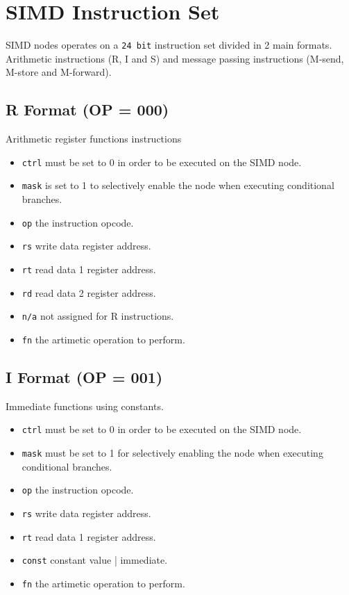 \section{SIMD Instruction Set}\label{apx:simd-instruction-set}

SIMD nodes operates on a {\tt 24 bit} instruction set divided in 2 main
formats. Arithmetic instructions (R, I and S) and message passing instructions
(M-send, M-store and M-forward).

\subsection[R Format]{R Format (OP = 000)}
Arithmetic register functions instructions



\begin{itemize}
\item {\tt ctrl} must be set to 0 in order to be executed on the SIMD node.
\item {\tt mask} is set to 1 to selectively enable the node when executing
  conditional branches.
\item {\tt op} the instruction opcode.
\item {\tt rs} write data register address.
\item {\tt rt} read data 1 register address.
\item {\tt rd} read data 2 register address.
\item {\tt n/a} not assigned for R instructions.
\item {\tt fn} the artimetic operation to perform.
\end{itemize}



\subsection[I Format]{I Format (OP = 001)}
Immediate functions using constants.



\begin{itemize}
\item {\tt ctrl} must be set to 0 in order to be executed on the SIMD node.
\item {\tt mask} must be set to 1 for selectively enabling the node when executing
  conditional branches.
\item {\tt op} the instruction opcode.
\item {\tt rs} write data register address.
\item {\tt rt} read data 1 register address.
\item {\tt const} constant value | immediate.
\item {\tt fn} the artimetic operation to perform.
\end{itemize}


